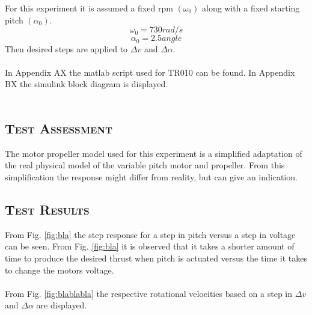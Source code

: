 For this experiment it is assumed a fixed rpm $(\omega_0)$ along with a fixed starting pitch  $(\alpha_0)$. 
$$\omega_0 = 730 rad/s$$
$$\alpha_0 = 2.5 angle$$
Then desired steps are applied to $\Delta v$ and $\Delta \alpha$.\\
\\
In Appendix AX the matlab script used for TR010 can be found. In Appendix BX the simulink block diagram is displayed.\\
\\

\subsection*{\textsc{\medium Test Assessment}}
The motor propeller model used for this experiment is a simplified adaptation of the real physical model of the variable pitch motor and propeller. From this simplification the response might differ from reality, but can give an indication. 

\subsection*{\textsc{\medium Test Results}}
From Fig. \ref{fig:bla} the step response for a step in pitch versus a step in voltage can be seen. From Fig. \ref{fig:bla} it is observed that it takes a shorter amount of time to produce the desired thrust when pitch is actuated versus the time it takes to change the motors voltage.\\
\\
From Fig. \ref{fig:blablabla} the respective rotational velocities based on a step in $\Delta v$ and $\Delta \alpha$ are displayed. 

